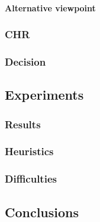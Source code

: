 \paragraph*{Alternative viewpoint}

\subsubsection{CHR}
\subsubsection{Decision}

\subsection{Experiments}
\subsubsection{Results}
\subsubsection{Heuristics}
\subsubsection{Difficulties}

\subsection{Conclusions}


